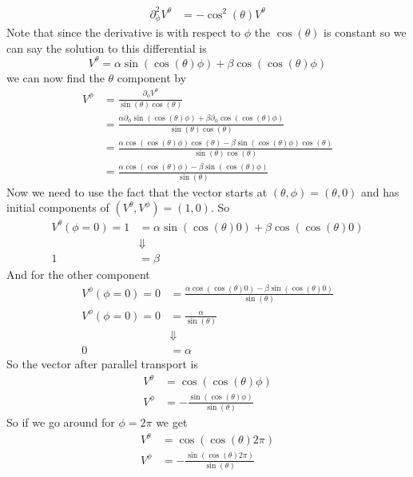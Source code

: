 \documentclass[11pt]{article}
\numberwithin{equation}{section}
\begin{document}
\begin{enumerate}[(a)]
\begin{align*}
\partial^2_{\phi}V^{\theta} &=  -\cos^2(\theta)V^{\theta}
\end{align*}
Note that since the derivative is with respect to $\phi$ the $\cos(\theta)$ is constant so we can say the solution to this differential is
$$V^{\theta} = \alpha\sin(\cos(\theta)\phi)+\beta\cos(\cos(\theta)\phi)$$
we can now find the $\theta$ component by 
\begin{align*}
V^{\phi} &= \frac{\partial_{\phi}V^{\theta}}{\sin(\theta)\cos(\theta)}\\
&= \frac{\alpha\partial_{\phi}\sin(\cos(\theta)\phi)+\beta\partial_{\phi}\cos(\cos(\theta)\phi)}{\sin(\theta)\cos(\theta)}\\
&= \frac{\alpha\cos(\cos(\theta)\phi)\cos(\theta)-\beta\sin(\cos(\theta)\phi)\cos(\theta)}{\sin(\theta)\cos(\theta)}\\
&= \frac{\alpha\cos(\cos(\theta)\phi)-\beta\sin(\cos(\theta)\phi)}{\sin(\theta)}
\end{align*}
Now we need to use the fact that the vector starts at $(\theta,\phi) = (\theta,0)$ and has initial components of $(V^{\theta},V^{\phi}) = (1,0)$. So 
\begin{align*}
V^{\theta}(\phi=0) = 1 &= \alpha\sin(\cos(\theta)0)+\beta\cos(\cos(\theta)0)\\
&\Downarrow\\
1 &= \beta
\end{align*}
And for the other component
\begin{align*}
V^{\phi}(\phi=0) = 0 &= \frac{\alpha\cos(\cos(\theta)0)-\beta\sin(\cos(\theta)0)}{\sin(\theta)}\\
V^{\phi}(\phi=0) = 0 &= \frac{\alpha}{\sin(\theta)}\\
&\Downarrow\\
0 &= \alpha
\end{align*}
So the vector after parallel transport is
\begin{align*}
V^{\theta} &= \cos(\cos(\theta)\phi)\\
V^{\phi} &= -\frac{\sin(\cos(\theta)\phi)}{\sin(\theta)}
\end{align*}
So if we go around for $\phi=2\pi$ we get
\begin{align*}
V^{\theta} &= \cos(\cos(\theta)2\pi)\\
V^{\phi} &= -\frac{\sin(\cos(\theta)2\pi)}{\sin(\theta)}
\end{align*}
\end{enumerate}
\end{document}
